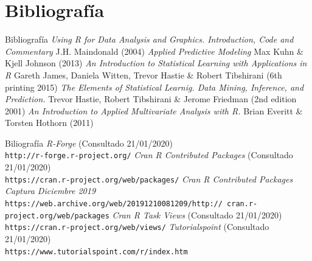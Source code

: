 \documentclass[xcolor=table]{beamer}
\begin{document}
\section{Bibliografía}
\begin{frame}{Bibliografía}
\textit{Using R for Data Analysis and Graphics. Introduction, Code and Commentary} J.H. Maindonald (2004)
\newline
\newline
\textit{Applied Predictive Modeling} Max Kuhn \& Kjell Johnson (2013)
\newline
\newline
\textit{An Introduction to Statistical Learning with Applications in R} Gareth James, Daniela Witten, Trevor Hastie \& Robert Tibshirani (6th printing 2015)
\newline
\newline
\textit{The Elements of Statistical Learnig. Data Mining, Inference, and Prediction.} Trevor Hastie, Robert Tibshirani \& Jerome Friedman (2nd edition 2001)
\newline
\newline
\textit{An Introduction to Applied Multivariate Analysis with R.} Brian Everitt \& Torsten Hothorn (2011)
\end{frame}

\begin{frame}{Biliografía}
\textit{R-Forge} (Consultado 21/01/2020)
\\\texttt{http://r-forge.r-project.org/}
\newline
\newline
\textit{Cran R Contributed Packages} (Consultado 21/01/2020)
\\\texttt{https://cran.r-project.org/web/packages/}
\newline
\newline
\textit{Cran R Contributed Packages Captura Diciembre 2019}
\\\texttt{https://web.archive.org/web/20191210081209/http://
cran.r-project.org/web/packages}
\newline
\newline
\textit{Cran R Task Views} (Consultado 21/01/2020)
\\\texttt{https://cran.r-project.org/web/views/}
\newline
\newline
\textit{Tutorialspoint} (Consultado 21/01/2020)
\\\texttt{https://www.tutorialspoint.com/r/index.htm}
\end{frame}
\end{document}
